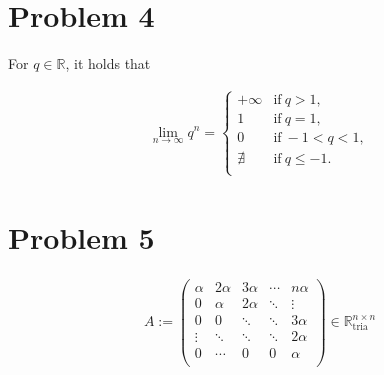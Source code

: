 \documentclass[]{article}
\begin{document}
\section*{Problem 4}

For $q \in \mathbb{R}$, it holds that

\begin{align*}
	\lim\limits_{n \to \infty} q^n = 
	\left\{
	\begin{array}{ll}
		+\infty & \textrm{if}\ q > 1, \\
		1 & \textrm{if}\ q = 1, \\
		0 & \textrm{if}\ -1 < q < 1, \\
		\nexists & \textrm{if}\ q \leq -1. \\
	\end{array}
	\right.
\end{align*}


\section*{Problem 5}

\begin{align*}
	A := \left(
	\begin{array}{ccccc}
		\alpha & 2\alpha & 3\alpha & \cdots & n\alpha \\
		0      & \alpha  & 2\alpha & \ddots & \vdots  \\
		0      & 0       & \ddots  & \ddots & 3\alpha \\
		\vdots & \ddots  & \ddots  & \ddots & 2\alpha \\
		0      & \cdots  & 0       & 0      & \alpha  \\
	\end{array}
	\right) \in \mathbb{R}^{n \times n}_{\textrm{tria}}
\end{align*}
\end{document}

